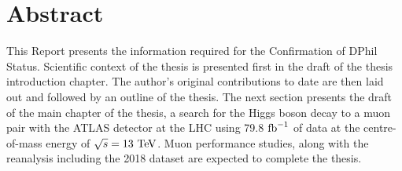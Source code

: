 \chapter*{Abstract}
This Report presents the information required for the Confirmation of DPhil Status.
Scientific context of the thesis is presented first in the draft of the thesis
introduction chapter. The author’s original contributions to date are then laid
out and followed by an outline of the thesis. The next section presents the draft
of the main chapter of the thesis, a search for the Higgs boson decay to a muon
pair with the ATLAS detector at the LHC using 79.8 $\text{fb}^{-1}$ of data at the centre-of-mass
energy of $\sqrt{s} = 13~\text{Te\kern -0.1em V}$. Muon performance studies, along with the reanalysis including
the 2018 dataset are expected to complete the thesis.


\thispagestyle{empty}
